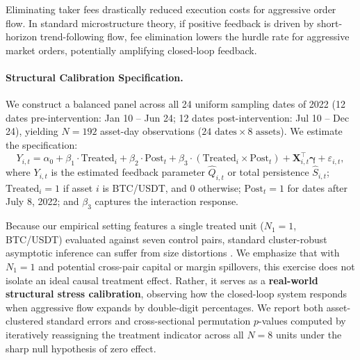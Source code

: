 \documentclass[12pt]{article}
\theoremstyle{definition}
\theoremstyle{remark}
\begin{document}
Eliminating taker fees drastically reduced execution costs for aggressive order flow. In standard microstructure theory, if positive feedback is driven by short-horizon trend-following flow, fee elimination lowers the hurdle rate for aggressive market orders, potentially amplifying closed-loop feedback.

\paragraph{Structural Calibration Specification.}
We construct a balanced panel across all 24 uniform sampling dates of 2022 (12 dates pre-intervention: Jan 10 -- Jun 24; 12 dates post-intervention: Jul 10 -- Dec 24), yielding $N = 192$ asset-day observations ($24 \text{ dates} \times 8 \text{ assets}$).
We estimate the specification:
\begin{equation}
Y_{i, t} = \alpha_0 + \beta_1 \cdot \text{Treated}_i + \beta_2 \cdot \text{Post}_t + \beta_3 \cdot (\text{Treated}_i \times \text{Post}_t) + \mathbf{X}_{i, t}^\top \boldsymbol{\gamma} + \varepsilon_{i, t},
\label{eq:did_regression}
\end{equation}
where $Y_{i, t}$ is the estimated feedback parameter $\hat{Q}_{i, t}$ or total persistence $\hat{S}_{i, t}$; $\text{Treated}_i = 1$ if asset $i$ is BTC/USDT, and $0$ otherwise; $\text{Post}_t = 1$ for dates after July 8, 2022; and $\beta_3$ captures the interaction response.

Because our empirical setting features a single treated unit ($N_1 = 1$, BTC/USDT) evaluated against seven control pairs, standard cluster-robust asymptotic inference can suffer from size distortions \citep{donald2007inference,mackinnon2018wild}. We emphasize that with $N_1 = 1$ and potential cross-pair capital or margin spillovers, this exercise does not isolate an ideal causal treatment effect. Rather, it serves as a \textbf{real-world structural stress calibration}, observing how the closed-loop system responds when aggressive flow expands by double-digit percentages. We report both asset-clustered standard errors and cross-sectional permutation $p$-values computed by iteratively reassigning the treatment indicator across all $N=8$ units under the sharp null hypothesis of zero effect.


\end{document}
